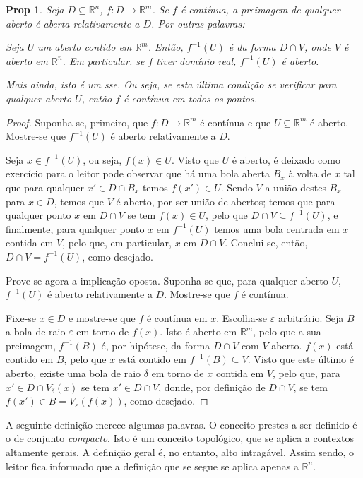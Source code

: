\documentclass{article}
\newcommand{\R}{\mathbb{R}}
\newtheorem{prop}{Prop}
\theoremstyle{definition}
\begin{document}
	\begin{prop}
	Seja $D \subseteq \R^n$, $f : D \to \R^m$. Se $f$ é contínua, a preimagem de qualquer aberto é aberta relativamente a $D$. Por outras palavras:
	
	Seja $U$ um aberto contido em $\R^m$. Então, $f^{-1}(U)$ é da forma $D \cap V$, onde $V$ é aberto em $\R^n$. Em particular. se $f$ tiver domínio real, $f^{-1}(U)$ é aberto.
	
	Mais ainda, isto é um sse. Ou seja, se esta última condição se verificar para qualquer aberto $U$, então $f$ é contínua em todos os pontos.
	\end{prop}
	
	\begin{proof}
	Suponha-se, primeiro, que $f : D \to \R^m$ é contínua e que $U \subseteq \R^m$ é aberto. Mostre-se que $f^{-1}(U)$ é aberto relativamente a $D$.
	
	Seja $x \in f^{-1}(U)$, ou seja, $f(x) \in U$. Visto que $U$ é aberto, é deixado como exercício para o leitor pode observar que há uma bola aberta $B_x$ à volta de $x$ tal que para qualquer $x' \in D \cap B_x$ temos $f(x') \in U$. Sendo $V$ a união destes $B_x$ para $x \in D$, temos que $V$ é aberto, por ser união de abertos; temos que para qualquer ponto $x$ em $D \cap V$ se tem $f(x) \in U$, pelo que $D \cap V \subseteq f^{-1}(U)$, e finalmente, para qualquer ponto $x$ em $f^{-1}(U)$ temos uma bola centrada em $x$ contida em $V$, pelo que, em particular, $x$ em $D \cap V$. Conclui-se, então, $D \cap V = f^{-1}(U)$, como desejado.
	
	Prove-se agora a implicação oposta. Suponha-se que, para qualquer aberto $U$, $f^{-1}(U)$ é aberto relativamente a $D$. Mostre-se que $f$ é contínua.
	
	Fixe-se $x \in D$ e mostre-se que $f$ é contínua em $x$. Escolha-se $\varepsilon$ arbitrário. Seja $B$ a bola de raio $\varepsilon$ em torno de $f(x)$. Isto é aberto em $\R^m$, pelo que a sua preimagem, $f^{-1}(B)$ é, por hipótese, da forma $D \cap V$ com $V$ aberto. $f(x)$ está contido em $B$, pelo que $x$ está contido em $f^{-1}(B) \subseteq V$. Visto que este último é aberto, existe uma bola de raio $\delta$ em torno de $x$ contida em $V$, pelo que, para $x' \in D \cap V_\delta(x)$ se tem $x' \in D \cap V$, donde, por definição de $D \cap V$, se tem $f(x') \in B = V_\varepsilon(f(x))$, como desejado.
	\end{proof}
	
	A seguinte definição merece algumas palavras. O conceito prestes a ser definido é o de conjunto \emph{compacto}. Isto é um conceito topológico, que se aplica a contextos altamente gerais. A definição geral é, no entanto, alto intragável. Assim sendo, o leitor fica informado que a definição que se segue se aplica apenas a $\R^n$.
	
\end{document}
